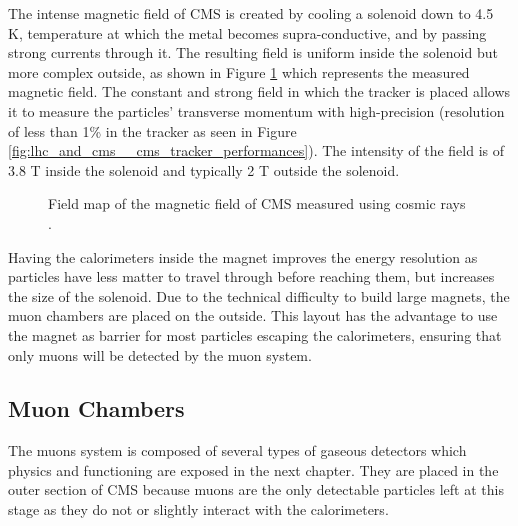			The intense magnetic field of CMS is created by cooling a solenoid down to 4.5 K, temperature at which the metal becomes supra-conductive, and by passing strong currents through it. The resulting field is uniform inside the solenoid but more complex outside, as shown in Figure \ref{fig:lhc_and_cms__cms_magnetic_field} which represents the measured magnetic field. The constant and strong field in which the tracker is placed allows it to measure the particles' transverse momentum with high-precision (resolution of less than 1\% in the tracker as seen in Figure \ref{fig:lhc_and_cms__cms_tracker_performances}). The intensity of the field is of 3.8 T inside the solenoid and typically 2 T outside the solenoid. \\

			\begin{figure}[h!]
				\centering
				\caption{Field map of the magnetic field of CMS measured using cosmic rays \Cite{CMS_B_Field}.}
				\label{fig:lhc_and_cms__cms_magnetic_field}
			\end{figure}

			Having the calorimeters inside the magnet improves the energy resolution as particles have less matter to travel through before reaching them, but increases the size of the solenoid. Due to the technical difficulty to build large magnets, the muon chambers are placed on the outside. This layout has the advantage to use the magnet as barrier for most particles escaping the calorimeters, ensuring that only muons will be detected by the muon system.

		\subsection{Muon Chambers}
		\label{sec:lhc_and_cms__muon_chambers}

			The muons system is composed of several types of gaseous detectors which physics and functioning are exposed in the next chapter. They are placed in the outer section of CMS because muons are the only detectable particles left at this stage as they do not or slightly interact with the calorimeters.
